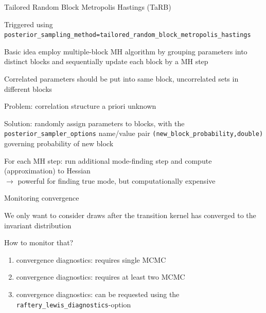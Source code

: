 \begin{frame}{Tailored Random Block Metropolis Hastings (TaRB)}

\begin{witemize}
    \item Triggered using\\
    \texttt{posterior\_sampling\_method=\textquotesingle  tailored\_random\_block\_metropolis\_hastings\textquotesingle}
    \item Basic idea employ multiple-block MH algorithm by grouping parameters into distinct blocks and sequentially update each block by a MH step
    \item Correlated parameters should be put into same block, uncorrelated sets in different blocks
    \item Problem: correlation structure a priori unknown
    \item Solution: randomly assign parameters to blocks, with the \texttt{posterior\_sampler\_options} name/value pair \texttt{(new\_block\_probability,double)} governing probability of new block
    \item For each MH step: run additional mode-finding step and compute (approximation) to Hessian\\
    $\rightarrow$ powerful for finding true mode, but computationally expensive
\end{witemize}

\end{frame}

\begin{frame}{Monitoring convergence}
\begin{witemize}
    \item We only want to consider draws after the transition kernel has converged to the invariant distribution
    \item How to monitor that?
    \begin{enumerate}
      \item \textcite{Geweke1992} convergence diagnostics: requires single MCMC
      \item \textcite{BrooksGelman1998} convergence diagnostics: requires at least two MCMC
      \item \textcite{RafteryLewis1992} convergence diagnostics: can be requested using the \\ \texttt{raftery\_lewis\_diagnostics}-option
    \end{enumerate}
\end{witemize}
\end{frame}

